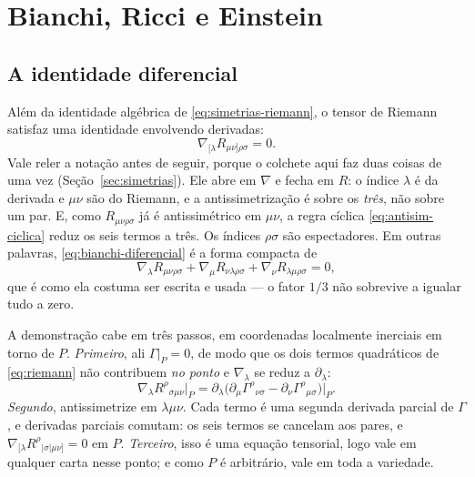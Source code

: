 \documentclass[12pt,a4paper,oneside]{book}
\theoremstyle{rgplain}
\theoremstyle{rgremark}
\begin{document}
\section{Bianchi, Ricci e Einstein}
\label{sec:bianchi-einstein}

\subsection*{A identidade diferencial}

Além da identidade algébrica de \eqref{eq:simetrias-riemann}, o tensor de
Riemann satisfaz uma identidade envolvendo derivadas:
\begin{equation}
  \nabla_{[\lambda}R_{\mu\nu]\rho\sigma}=0 .
  \label{eq:bianchi-diferencial}
\end{equation}
Vale reler a notação antes de seguir, porque o colchete aqui faz duas coisas de
uma vez (Seção~\ref{sec:simetrias}). Ele abre em $\nabla$ e fecha em $R$: o
índice $\lambda$ é da derivada e $\mu\nu$ são do Riemann, e a antissimetrização
é sobre os \emph{três}, não sobre um par. E, como $R_{\mu\nu\rho\sigma}$ já é
antissimétrico em $\mu\nu$, a regra cíclica \eqref{eq:antisim-ciclica} reduz os
seis termos a três. Os índices $\rho\sigma$ são espectadores. Em outras
palavras, \eqref{eq:bianchi-diferencial} é a forma compacta de
\begin{equation}
  \nabla_\lambda R_{\mu\nu\rho\sigma}
 +\nabla_\mu R_{\nu\lambda\rho\sigma}
 +\nabla_\nu R_{\lambda\mu\rho\sigma}=0 ,
  \label{eq:bianchi-ciclica}
\end{equation}
que é como ela costuma ser escrita e usada --- o fator $1/3$ não sobrevive a
igualar tudo a zero.

A demonstração cabe em três passos, em coordenadas localmente inerciais em
torno de $P$. \emph{Primeiro}, ali $\Gamma|_P=0$, de modo que os dois termos
quadráticos de \eqref{eq:riemann} não contribuem \emph{no ponto} e
$\nabla_\lambda$ se reduz a $\partial_\lambda$:
\[
  \nabla_\lambda R^\rho{}_{\sigma\mu\nu}\big|_P
  =\partial_\lambda\bigl(\partial_\mu\Gamma^\rho{}_{\nu\sigma}
   -\partial_\nu\Gamma^\rho{}_{\mu\sigma}\bigr)\Big|_P .
\]
\emph{Segundo}, antissimetrize em $\lambda\mu\nu$. Cada termo é uma segunda
derivada parcial de $\Gamma$, e derivadas parciais comutam: os seis termos se
cancelam aos pares, e $\nabla_{[\lambda}R^\rho{}_{|\sigma|\mu\nu]}=0$ em
$P$. \emph{Terceiro}, isso é uma equação tensorial, logo vale em qualquer
carta nesse ponto; e como $P$ é arbitrário, vale em toda a variedade.
\end{document}
